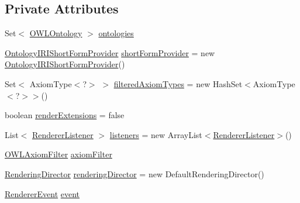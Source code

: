 \subsection*{Private Attributes}
\begin{DoxyCompactItemize}
\item 
Set$<$ \hyperlink{interfaceorg_1_1semanticweb_1_1owlapi_1_1model_1_1_o_w_l_ontology}{O\-W\-L\-Ontology} $>$ \hyperlink{classuk_1_1ac_1_1manchester_1_1cs_1_1owl_1_1owlapi_1_1mansyntaxrenderer_1_1_manchester_o_w_l_syntax_frame_renderer_a963943f6e6ba0417b4683ad6f30e8866}{ontologies}
\item 
\hyperlink{classorg_1_1semanticweb_1_1owlapi_1_1util_1_1_ontology_i_r_i_short_form_provider}{Ontology\-I\-R\-I\-Short\-Form\-Provider} \hyperlink{classuk_1_1ac_1_1manchester_1_1cs_1_1owl_1_1owlapi_1_1mansyntaxrenderer_1_1_manchester_o_w_l_syntax_frame_renderer_ab21399868f4c420e7bbb9eab40c1d94c}{short\-Form\-Provider} = new \hyperlink{classorg_1_1semanticweb_1_1owlapi_1_1util_1_1_ontology_i_r_i_short_form_provider}{Ontology\-I\-R\-I\-Short\-Form\-Provider}()
\item 
Set$<$ Axiom\-Type$<$?$>$ $>$ \hyperlink{classuk_1_1ac_1_1manchester_1_1cs_1_1owl_1_1owlapi_1_1mansyntaxrenderer_1_1_manchester_o_w_l_syntax_frame_renderer_a1ec5502137a92708ac03d552b3ee0f1a}{filtered\-Axiom\-Types} = new Hash\-Set$<$Axiom\-Type$<$?$>$$>$()
\item 
boolean \hyperlink{classuk_1_1ac_1_1manchester_1_1cs_1_1owl_1_1owlapi_1_1mansyntaxrenderer_1_1_manchester_o_w_l_syntax_frame_renderer_a1995a56ff1a626f1623d0e9814538f95}{render\-Extensions} = false
\item 
List$<$ \hyperlink{interfaceuk_1_1ac_1_1manchester_1_1cs_1_1owl_1_1owlapi_1_1mansyntaxrenderer_1_1_renderer_listener}{Renderer\-Listener} $>$ \hyperlink{classuk_1_1ac_1_1manchester_1_1cs_1_1owl_1_1owlapi_1_1mansyntaxrenderer_1_1_manchester_o_w_l_syntax_frame_renderer_a5524e050a6c0c5661456e28faef25f9b}{listeners} = new Array\-List$<$\hyperlink{interfaceuk_1_1ac_1_1manchester_1_1cs_1_1owl_1_1owlapi_1_1mansyntaxrenderer_1_1_renderer_listener}{Renderer\-Listener}$>$()
\item 
\hyperlink{interfaceorg_1_1semanticweb_1_1owlapi_1_1util_1_1_o_w_l_axiom_filter}{O\-W\-L\-Axiom\-Filter} \hyperlink{classuk_1_1ac_1_1manchester_1_1cs_1_1owl_1_1owlapi_1_1mansyntaxrenderer_1_1_manchester_o_w_l_syntax_frame_renderer_a527ce3ca7b7258f2aae0dd657f8f390f}{axiom\-Filter}
\item 
\hyperlink{interfaceuk_1_1ac_1_1manchester_1_1cs_1_1owl_1_1owlapi_1_1mansyntaxrenderer_1_1_rendering_director}{Rendering\-Director} \hyperlink{classuk_1_1ac_1_1manchester_1_1cs_1_1owl_1_1owlapi_1_1mansyntaxrenderer_1_1_manchester_o_w_l_syntax_frame_renderer_a640446a795a26acb8cac36f4774e21dd}{rendering\-Director} = new Default\-Rendering\-Director()
\item 
\hyperlink{classuk_1_1ac_1_1manchester_1_1cs_1_1owl_1_1owlapi_1_1mansyntaxrenderer_1_1_renderer_event}{Renderer\-Event} \hyperlink{classuk_1_1ac_1_1manchester_1_1cs_1_1owl_1_1owlapi_1_1mansyntaxrenderer_1_1_manchester_o_w_l_syntax_frame_renderer_adfc0ca3452170709cb18fe347ed696eb}{event}
\end{DoxyCompactItemize}
